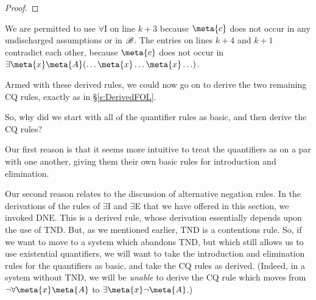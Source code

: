 \begin{proof}
	\open
	\close
	\open
	\close
\end{proof}\noindent
We are permitted to use $\forall$I on line $k+3$ because $\meta{c}$ does not occur in any  undischarged assumptions or in $\mathscr{B}$. The entries on lines $k+4$ and $k+1$ contradict each other, because $\meta{c}$ does not occur in $\exists \meta{x} \meta{A}(\ldots \meta{x} \ldots \meta{x} \ldots)$.

Armed with these derived rules, we could now go on to derive the two remaining CQ rules, exactly as in \S\ref{s:DerivedFOL}.

So, why did we start with all of the quantifier rules as basic, and then derive the CQ rules? 

Our first reason is that it seems more intuitive to treat the quantifiers as on a par with one another, giving them their own basic rules for introduction and elimination. 

Our second reason relates to the discussion of alternative negation rules. In the derivations of the rules of $\exists$I and $\exists$E that we have offered in this section, we invoked DNE. This is a derived rule, whose derivation essentially depends upon the use of TND. But, as we mentioned earlier, TND is a contentious rule. So, if we want to move to a system which abandons TND, but which still allows us to use existential quantifiers, we will want to take the introduction and elimination rules for the quantifiers as basic, and take the CQ rules as derived. (Indeed, in a system without TND, we will be \emph{unable} to derive the CQ rule which moves from $\enot \forall \meta{x} \meta{A}$ to $\exists \meta{x} \enot \meta{A}$.)
